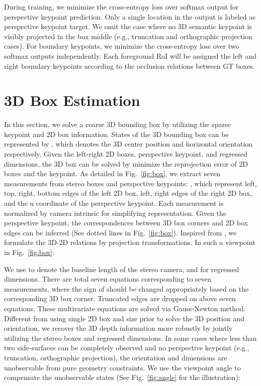 \documentclass[10pt,twocolumn,letterpaper]{article}
\begin{document}
	During training, we minimize the cross-entropy loss over  softmax output for perspective keypoint prediction. Only a single location in the  output is labeled as perspective keypoint target. We omit the case where no 3D semantic keypoint is visibly projected in the box middle (e.g., truncation and orthographic projection cases). For boundary keypoints, we minimize the cross-entropy loss over two  softmax outputs independently. Each foreground RoI will be assigned the left and right boundary keypoints according to the occlusion relations between GT boxes.
\iffalse
	\begin{figure}
		\begin{center}
			\texttt{[image: softmax]}
		\end{center}
		\caption{Six output channels for keypoint prediction, where the first four channels produce one exclusive perspective keypoint while the other two channels output two boundary keypoints.}
		\label{fig:softmax}
	\end{figure}
\fi	
	\section{3D Box Estimation}
	\label{sec:box}
	In this section, we solve a coarse 3D bounding box by utilizing the sparse keypoint and 2D box information. States of the 3D bounding box can be represented by , which denotes the 3D center position and horizontal orientation respectively. Given the left-right 2D boxes, perspective keypoint, and regressed dimensions, the 3D box can be solved by minimize the reprojection error of 2D boxes and the keypoint. As detailed in Fig.~\ref{fig:box}, we extract seven measurements from stereo boxes and perspective keypoints: , which represent left, top, right, bottom edges of the left 2D box, left, right edges of the right 2D box, and the u coordinate of the perspective keypoint. Each measurement is normalized by camera intrinsic for simplifying representation. Given the perspective keypoint, the correspondences between 3D box corners and 2D box edges can be inferred (See dotted lines in Fig.~\ref{fig:box}). Inspired from \cite{li2018semantic}, we formulate the 3D-2D relations by projection transformations. In such a viewpoint in Fig.~\ref{fig:box}:
	
	We use  to denote the baseline length of the stereo camera, and  for regressed dimensions. There are total seven equations corresponding to seven measurements, where the sign of  should be changed appropriately based on the corresponding 3D box corner. Truncated edges are dropped on above seven equations. These multivariate equations are solved via Gauss-Newton method. Different from \cite{li2018semantic} using single 2D box and size prior to solve the 3D position and orientation, we recover the 3D depth information more robustly by jointly utilizing the stereo boxes and regressed dimensions. In some cases where less than two side-surfaces can be completely observed and no perspective keypoint  (e.g., truncation, orthographic projection), the orientation and dimensions are unobservable from pure geometry constraints. We use the viewpoint angle  to compensate the unobservable states (See Fig.~\ref{fig:angle} for the illustration):
	
\end{document}
